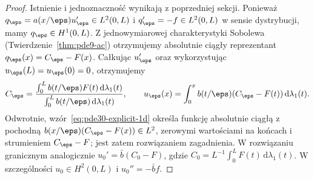\begin{proof}
Istnienie i jednoznaczność wynikają z poprzedniej sekcji.
Ponieważ $q_\eps=a(x/\eps)u_\eps'\in L^2(0,L)$
i $q_\eps'=-f\in L^2(0,L)$ w sensie dystrybucji,
mamy $q_\eps\in H^1(0,L)$. Z jednowymiarowej
charakterystyki Sobolewa (Twierdzenie~\ref{thm:pde9-ac})
otrzymujemy absolutnie ciągły reprezentant
$q_\eps(x)=C_\eps-F(x)$. Całkując $u_\eps'$ oraz
wykorzystując $u_\eps(L)=u_\eps(0)=0$, otrzymujemy
\begin{equation}\label{eq:pde30-explicit-1d}
 C_\eps=\frac{\int_0^L b(t/\eps)F(t)\,\mathrm d\lambda_1(t)}
 {\int_0^L b(t/\eps)\,\mathrm d\lambda_1(t)},\qquad
 u_\eps(x)=\int_0^xb(t/\eps)(C_\eps-F(t))\,\mathrm d\lambda_1(t).
\end{equation}
Odwrotnie, wzór~\eqref{eq:pde30-explicit-1d}
określa funkcję absolutnie ciągłą z pochodną
$b(x/\eps)(C_\eps-F(x))\in L^2$, zerowymi wartościami
na końcach i strumieniem $C_\eps-F$; jest zatem
rozwiązaniem zagadnienia. W rozwiązaniu granicznym
analogicznie $u_0'=\bar b(C_0-F)$,
gdzie $C_0=L^{-1}\int_0^LF(t)\,\mathrm d\lambda_1(t)$.
W szczególności $u_0\in H^2(0,L)$ i
$u_0''=-\bar b f$.


\end{proof}
